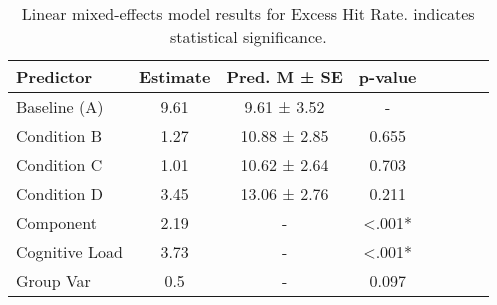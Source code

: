 
    \begin{table}[H]
    \centering
    \begin{small}
    \begin{tabular}{lccccccc}
\toprule
Predictor & Estimate & Pred. M ± SE & p-value \\
\midrule
Baseline (A) & 9.61 & 9.61 ± 3.52 & - \\
Condition B & 1.27 & 10.88 ± 2.85 & 0.655 \\
Condition C & 1.01 & 10.62 ± 2.64 & 0.703 \\
Condition D & 3.45 & 13.06 ± 2.76 & 0.211 \\
Component & 2.19 & - & <.001* \\
Cognitive Load & 3.73 & - & <.001* \\
Group Var & 0.5 & - & 0.097 \\
\bottomrule
\end{tabular}

    \end{small}
    \caption[Linear mixed-effects model results for Excess Hit Rate]{Linear mixed-effects model results for Excess Hit Rate. \newline * indicates statistical significance.}
    \label{tab:excesshitrate}

    \end{table}